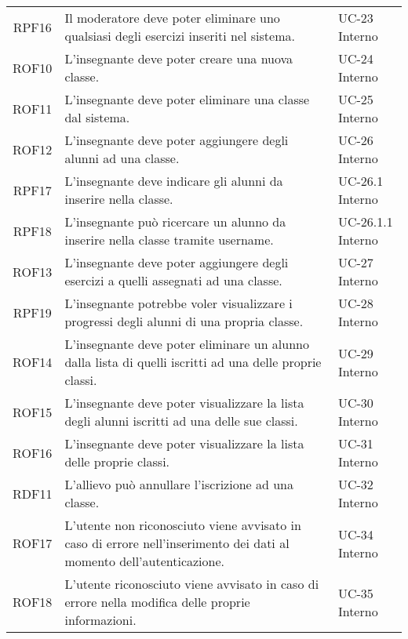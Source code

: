 \begin{tabularx}{\textwidth}{| c | p{10cm} | X |}
		RPF16 & Il moderatore deve poter eliminare uno qualsiasi degli esercizi inseriti nel sistema. & UC-23 \newline Interno\\
		ROF10 & L'insegnante deve poter creare una nuova classe. & UC-24 \newline Interno\\
		ROF11 & L'insegnante deve poter eliminare una classe dal sistema. & UC-25 \newline Interno\\
		ROF12 & L'insegnante deve poter aggiungere degli alunni ad una classe. & UC-26 \newline Interno\\
		RPF17 & L'insegnante deve indicare gli alunni da inserire nella classe. & UC-26.1 \newline Interno\\
		RPF18 & L'insegnante può ricercare un alunno da inserire nella classe tramite username. & UC-26.1.1 \newline Interno\\
		ROF13 & L'insegnante deve poter aggiungere degli esercizi a quelli assegnati ad una classe. & UC-27 \newline Interno\\
		RPF19 & L'insegnante potrebbe voler visualizzare i progressi degli alunni di una propria classe. & UC-28 \newline Interno\\
		ROF14 & L'insegnante deve poter eliminare un alunno dalla lista di quelli iscritti ad una delle proprie classi. & UC-29 \newline Interno\\
		ROF15 & L'insegnante deve poter visualizzare la lista degli alunni iscritti ad una delle sue classi. & UC-30 \newline Interno\\
		ROF16 & L'insegnante deve poter visualizzare la lista delle proprie classi. & UC-31 \newline Interno\\
		RDF11 & L'allievo può annullare l'iscrizione ad una classe. & UC-32 \newline Interno\\
		ROF17 & L'utente non riconosciuto viene avvisato in caso di errore nell'inserimento dei dati al momento dell'autenticazione. & UC-34 \newline Interno\\
		ROF18 & L'utente riconosciuto viene avvisato in caso di errore nella modifica delle proprie informazioni. & UC-35 \newline Interno\\

\end{tabularx}
